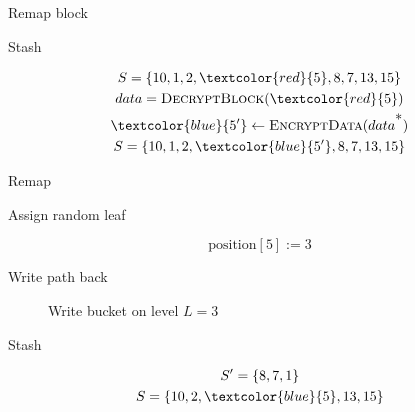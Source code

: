 	\begin{frame}{Remap block}
		
		\begin{block}{Stash}

			\begin{gather*}
				S = \{ 10, 1, 2, \textcolor{red}{5}, 8, 7, 13, 15 \} \\
				data = \textsc{DecryptBlock}(\textcolor{red}{5}) \\
				\textcolor{blue}{5^\prime} \gets \textsc{EncryptData}(data^{\mbox{*}}) \\
				S = \{ 10, 1, 2, \textcolor{blue}{5^\prime}, 8, 7, 13, 15 \}
			\end{gather*}

		\end{block}

		\begin{block}{Remap}
			
			Assign random leaf

			\[
				\text{position}[5] := 3
			\]

		\end{block}
		
	\end{frame}

	\begin{frame}{Write path back}
		
		\selectedtrue
		\pathreadtrue

		\nodeonenewtrue

		\begin{figure}
			\centering

			
			\caption{Write bucket on level $L = 3$}
		\end{figure}

		\vspace{-12pt}

		\begin{block}{Stash}
			
			\begin{gather*}
				S^\prime = \{ 8, 7, 1 \} \\
				S = \{ 10, 2, \textcolor{blue}{5}, 13, 15 \}
			\end{gather*}

		\end{block}
		
	\end{frame}

